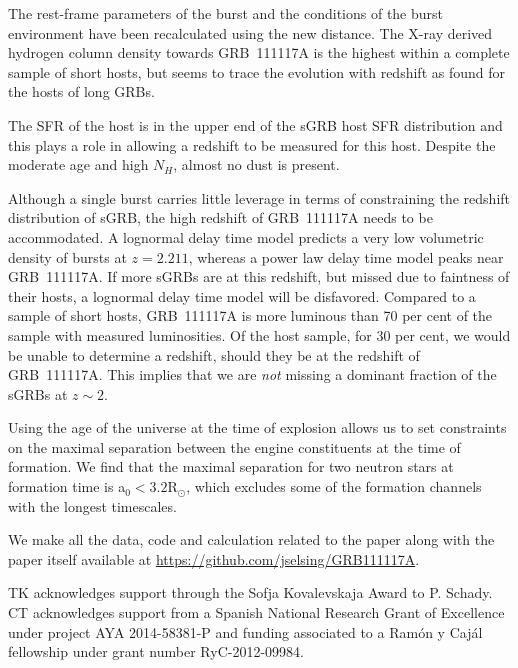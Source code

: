 \documentclass{aa}    %
\begin{document}
The rest-frame parameters of the burst and the conditions of the burst
environment have been recalculated using the new distance. The X-ray derived
hydrogen column density towards GRB~111117A is the highest within a complete
sample of short hosts, but seems to trace the evolution with redshift as found
for the hosts of long GRBs.

The SFR of the host is in the upper end of the sGRB host SFR distribution and
this plays a role in allowing a redshift to be measured for this host. Despite
the moderate age and high $N_H$, almost no dust is present.

Although a single burst carries little leverage in terms of constraining the
redshift distribution of sGRB, the high redshift of GRB~111117A needs to be
accommodated. A lognormal delay time model predicts a very low volumetric
density of bursts at $z = 2.211$, whereas a power law delay time model peaks
near GRB~111117A. If more sGRBs are at this redshift, but missed due to
faintness of their hosts, a lognormal delay time model will be disfavored.
Compared to a sample of short hosts, GRB~111117A is more luminous than 70 per
cent of the sample with measured luminosities. Of the host sample, for 30 per
cent, we would be unable to determine a redshift, should they be at the redshift
of GRB~111117A. This implies that we are \textit{not} missing a dominant
fraction of the sGRBs at $z \sim 2$.

Using the age of the universe at the time of explosion allows us to set
constraints on the maximal separation between the engine constituents at the
time of formation. We find that the maximal separation for two neutron stars at
formation time is a$_0 < 3.2 $R$_\odot$, which excludes some of the formation
channels with the longest timescales.

We make all the data, code and calculation related to the paper along with the
paper itself available at \url{https://github.com/jselsing/GRB111117A}.

\begin{acknowledgements}
TK acknowledges support through the Sofja Kovalevskaja Award to P. Schady. CT acknowledges support from a Spanish National Research Grant of Excellence under project AYA 2014-58381-P and funding associated to a Ramón y Cajál fellowship under grant number RyC-2012-09984.
\end{acknowledgements}




\newpage




\end{document}
